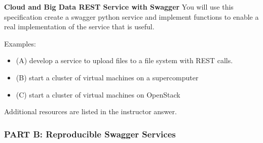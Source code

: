 \begin{exercise} {\bf Cloud and Big Data REST Service with Swagger}
 You will use this specification create a swagger python service and
 implement functions to enable a real implementation of the service
 that is useful.

 
Examples:

\begin{itemize}
\smallskip
\item (A) develop a service to upload files to a file system with REST calls.

\item (B) start a cluster of virtual machines on a supercomputer

\item (C) start a cluster of virtual machines on OpenStack

\end{itemize}


Additional resources are listed in the instructor answer. 
\end{exercise}

\subsubsection{PART B: Reproducible Swagger Services}

